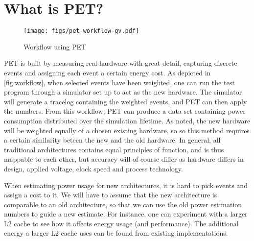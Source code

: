 \section{What is PET?}
\label{sec:whatispet}
\begin{figure}
    \texttt{[image: figs/pet-workflow-gv.pdf]}
    \caption{Workflow using PET}
    \label{fig:workflow}
\end{figure}

PET is built by measuring real hardware with great detail, capturing discrete
events and assigning each event a certain energy cost. As depicted in
\autoref{fig:workflow}, when selected events have been weighted, one can run the
test program through a simulator set up to act as the new hardware. The simulator
will generate a tracelog containing the weighted events, and PET can then apply
the numbers. From this workflow, PET can produce a data set containing power
consumption distributed over the simulation lifetime. As noted, the new hardware
will be weighted equally of a chosen existing hardware, so so this method
requires a certain similarity beteen the new and the old hardware. In general,
all traditional architectures contains equal principles of function, and is thus
mappable to each other, but accuracy will of course differ as hardware differs
in design, applied voltage, clock speed and process technology.

When estimating power usage for new architectures, it is hard to pick events and
assign a cost to it. We will have to assume that the new architecture is
comparable to an old architecture, so that we can use the old power estimation
numbers to guide a new estimate. For instance, one can experiment with a
larger L2 cache to see how it affects energy usage (and performance). The
additional energy a larger L2 cache uses can be found from existing
implementations.
